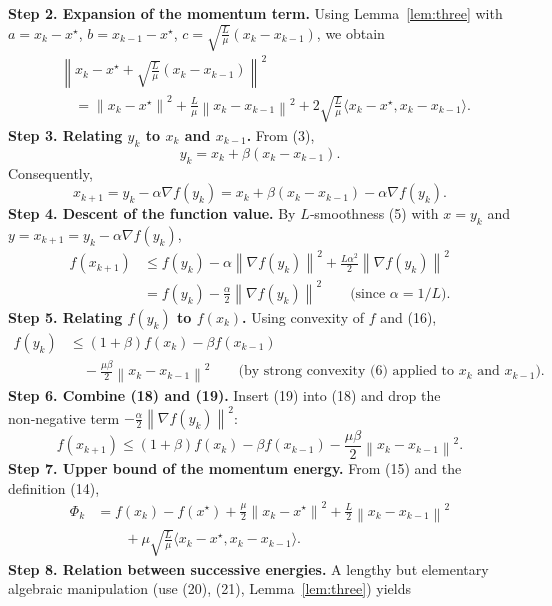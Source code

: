 \documentclass{article}
\newcommand{\grad}{\nabla}
\newcommand{\norm}[1]{\left\|#1\right\|}
\newcommand{\ip}[2]{\langle #1,#2\rangle}
\begin{document}
\noindent\textbf{Step 2. Expansion of the momentum term.}  
Using Lemma~\ref{lem:three} with
$a=x_{k}-x^{\star}$,
$b=x_{k-1}-x^{\star}$,
$c=\sqrt{\tfrac{L}{\mu}}(x_{k}-x_{k-1})$,
we obtain
\[
\begin{aligned}
&\norm{x_{k}-x^{\star}+\sqrt{\tfrac{L}{\mu}}(x_{k}-x_{k-1})}^{2}\\
&\quad =\norm{x_{k}-x^{\star}}^{2}
+ \tfrac{L}{\mu}\norm{x_{k}-x_{k-1}}^{2}
+2\sqrt{\tfrac{L}{\mu}}\ip{x_{k}-x^{\star}}{x_{k}-x_{k-1}}. \tag{15}
\end{aligned}
\]
\noindent\textbf{Step 3. Relating $y_{k}$ to $x_{k}$ and $x_{k-1}$.}  
From (3),
\[
y_{k}=x_{k}+ \beta (x_{k}-x_{k-1}). \tag{16}
\]
Consequently,
\[
x_{k+1}=y_{k}-\alpha\grad f(y_{k})
= x_{k}+ \beta (x_{k}-x_{k-1})-\alpha\grad f(y_{k}). \tag{17}
\]
\noindent\textbf{Step 4. Descent of the function value.}  
By $L$‑smoothness (5) with $x=y_{k}$ and $y=x_{k+1}=y_{k}-\alpha\grad f(y_{k})$,
\[
\begin{aligned}
f(x_{k+1})
&\le f(y_{k})-\alpha\norm{\grad f(y_{k})}^{2}
+\frac{L\alpha^{2}}{2}\norm{\grad f(y_{k})}^{2}  \\
&= f(y_{k})-\frac{\alpha}{2}\norm{\grad f(y_{k})}^{2}   \qquad\bigl(\text{since }\alpha=1/L\bigr). \tag{18}
\end{aligned}
\]
\noindent\textbf{Step 5. Relating $f(y_{k})$ to $f(x_{k})$.}  
Using convexity of $f$ and (16),
\[
\begin{aligned}
f(y_{k})
&\le (1+\beta)f(x_{k})-\beta f(x_{k-1}) \\
&\quad -\frac{\mu\beta}{2}\norm{x_{k}-x_{k-1}}^{2}
\qquad\text{(by strong convexity (6) applied to $x_{k}$ and $x_{k-1}$)}. \tag{19}
\end{aligned}
\]
\noindent\textbf{Step 6. Combine (18) and (19).}  
Insert (19) into (18) and drop the non‑negative term $-\frac{\alpha}{2}\norm{\grad f(y_{k})}^{2}$:
\[
f(x_{k+1})\le (1+\beta)f(x_{k})-\beta f(x_{k-1})
-\frac{\mu\beta}{2}\norm{x_{k}-x_{k-1}}^{2}. \tag{20}
\]
\noindent\textbf{Step 7. Upper bound of the momentum energy.}  
From (15) and the definition (14),
\[
\begin{aligned}
\Phi_{k}
&=f(x_{k})-f(x^{\star})+\frac{\mu}{2}\norm{x_{k}-x^{\star}}^{2}
+\frac{L}{2}\norm{x_{k}-x_{k-1}}^{2}\\
&\qquad +\mu\sqrt{\tfrac{L}{\mu}}\ip{x_{k}-x^{\star}}{x_{k}-x_{k-1}}. \tag{21}
\end{aligned}
\]
\noindent\textbf{Step 8. Relation between successive energies.}  
A lengthy but elementary algebraic manipulation (use (20), (21), Lemma~\ref{lem:three}) yields
\end{document}
